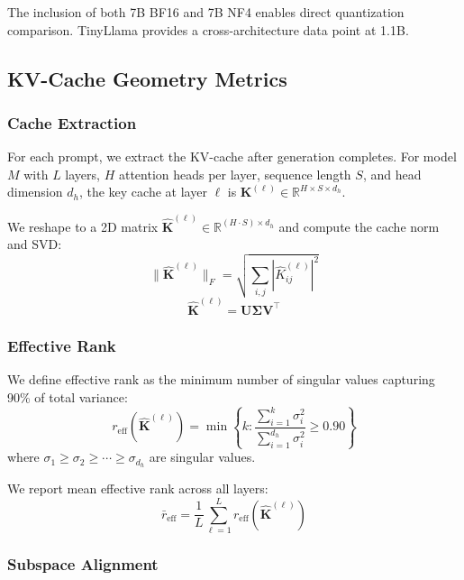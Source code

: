 \documentclass[11pt,a4paper]{article}
\begin{document}
The inclusion of both 7B BF16 and 7B NF4 enables direct quantization comparison. TinyLlama provides a cross-architecture data point at 1.1B.

\subsection{KV-Cache Geometry Metrics}

\subsubsection{Cache Extraction}

For each prompt, we extract the KV-cache after generation completes. For model $M$ with $L$ layers, $H$ attention heads per layer, sequence length $S$, and head dimension $d_h$, the key cache at layer $\ell$ is $\mathbf{K}^{(\ell)} \in \mathbb{R}^{H \times S \times d_h}$.

We reshape to a 2D matrix $\hat{\mathbf{K}}^{(\ell)} \in \mathbb{R}^{(H \cdot S) \times d_h}$ and compute the cache norm and SVD:
\begin{equation}
    \|\hat{\mathbf{K}}^{(\ell)}\|_F = \sqrt{\sum_{i,j} |\hat{K}^{(\ell)}_{ij}|^2}
\end{equation}
\begin{equation}
    \hat{\mathbf{K}}^{(\ell)} = \mathbf{U} \boldsymbol{\Sigma} \mathbf{V}^\top
\end{equation}

\subsubsection{Effective Rank}

We define effective rank as the minimum number of singular values capturing 90\% of total variance:
\begin{equation}
    r_{\text{eff}}(\hat{\mathbf{K}}^{(\ell)}) = \min \left\{ k : \frac{\sum_{i=1}^{k} \sigma_i^2}{\sum_{i=1}^{d_h} \sigma_i^2} \geq 0.90 \right\}
    \label{eq:eff_rank}
\end{equation}
where $\sigma_1 \geq \sigma_2 \geq \cdots \geq \sigma_{d_h}$ are singular values.

We report mean effective rank across all layers:
\begin{equation}
    \bar{r}_{\text{eff}} = \frac{1}{L} \sum_{\ell=1}^{L} r_{\text{eff}}(\hat{\mathbf{K}}^{(\ell)})
\end{equation}

\subsubsection{Subspace Alignment}
\end{document}

